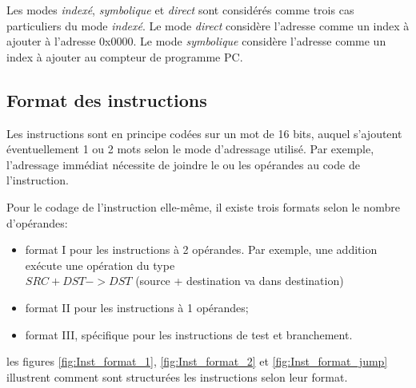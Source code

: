 Les modes \textit{indexé}, \textit{symbolique} et \textit{direct} sont considérés comme trois cas particuliers du mode \textit{indexé}. Le mode \textit{direct} considère l'adresse comme un index à ajouter à l'adresse 0x0000. Le mode \textit{symbolique} considère l'adresse comme un index à ajouter au compteur de programme PC.

\subsection{Format des instructions}
Les instructions sont en principe codées sur un mot de 16 bits, auquel s'ajoutent éventuellement 1 ou 2 mots selon le mode d'adressage utilisé. Par exemple, l'adressage immédiat nécessite de joindre le ou les opérandes au code de l'instruction.

Pour le codage de l'instruction elle-même, il existe trois formats selon le nombre d'opérandes:
\begin{itemize}[label=\textbullet,font=\small]
\item format I pour les instructions à 2 opérandes. Par exemple, une addition exécute une opération du type\\ $SRC + DST -> DST$ (source + destination va dans destination)
\item format II pour les instructions à 1 opérandes;
\item format III, spécifique pour les instructions de test et branchement.
\end{itemize}

les figures \ref{fig:Inst_format_1}, \ref{fig:Inst_format_2} et \ref{fig:Inst_format_jump} illustrent comment sont structurées les instructions selon leur format.

